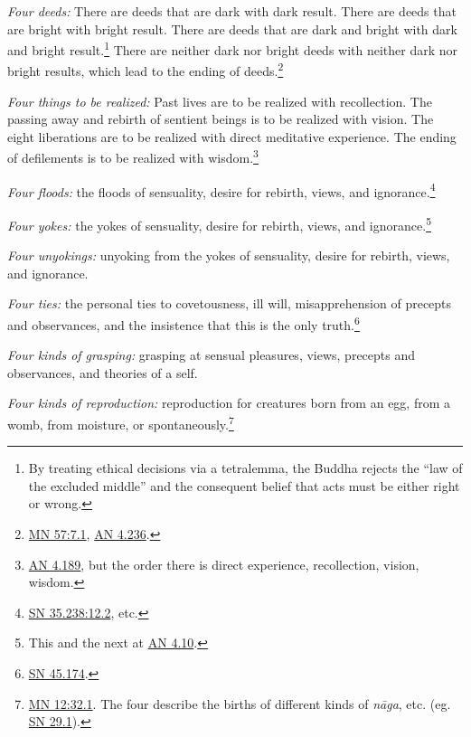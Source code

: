 \documentclass[12pt,openany]{book}%
\begin{document}
\emph{Four deeds:} There are deeds that are dark with dark result. There are deeds that are bright with bright result. There are deeds that are dark and bright with dark and bright result.\footnote{By treating ethical decisions via a tetralemma, the Buddha rejects the “law of the excluded middle” and the consequent belief that acts must be either right or wrong. } There are neither dark nor bright deeds with neither dark nor bright results, which lead to the ending of deeds.\footnote{\href{https://suttacentral.net/mn57/en/sujato\#7.1}{MN 57:7.1}, \href{https://suttacentral.net/an4.236/en/sujato}{AN 4.236}. } 

\emph{Four things to be realized:} Past lives are to be realized with recollection. The passing away and rebirth of sentient beings is to be realized with vision. The eight liberations are to be realized with direct meditative experience. The ending of defilements is to be realized with wisdom.\footnote{\href{https://suttacentral.net/an4.189/en/sujato}{AN 4.189}, but the order there is direct experience, recollection, vision, wisdom. } 

\emph{Four floods:} the floods of sensuality, desire for rebirth, views, and ignorance.\footnote{\href{https://suttacentral.net/sn35.238/en/sujato\#12.2}{SN 35.238:12.2}, etc. } 

\emph{Four yokes:} the yokes of sensuality, desire for rebirth, views, and ignorance.\footnote{This and the next at \href{https://suttacentral.net/an4.10/en/sujato}{AN 4.10}. } 

\emph{Four unyokings:} unyoking from the yokes of sensuality, desire for rebirth, views, and ignorance. 

\emph{Four ties:} the personal ties to covetousness, ill will, misapprehension of precepts and observances, and the insistence that this is the only truth.\footnote{\href{https://suttacentral.net/sn45.174/en/sujato}{SN 45.174}. } 

\emph{Four kinds of grasping:} grasping at sensual pleasures, views, precepts and observances, and theories of a self. 

\emph{Four kinds of reproduction:} reproduction for creatures born from an egg, from a womb, from moisture, or spontaneously.\footnote{\href{https://suttacentral.net/mn12/en/sujato\#32.1}{MN 12:32.1}. The four describe the births of different kinds of \textit{\textsanskrit{nāga}}, etc. (eg. \href{https://suttacentral.net/sn29.1/en/sujato}{SN 29.1}). } 
\end{document}
